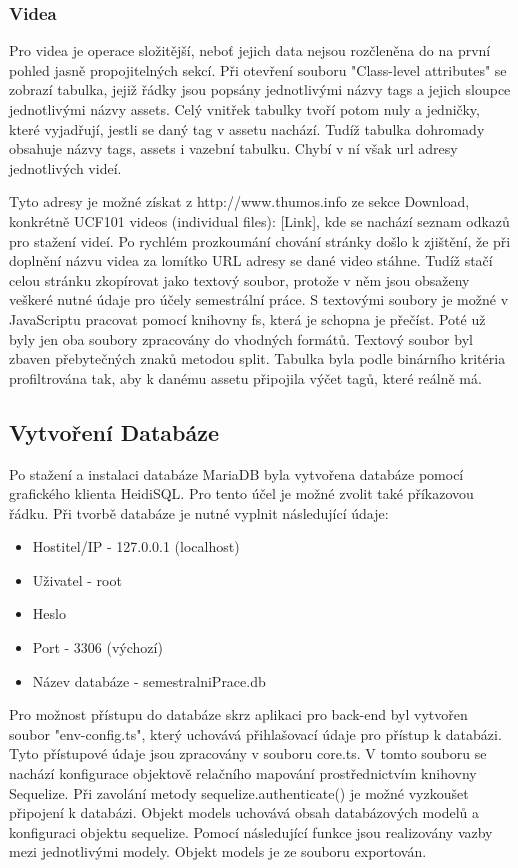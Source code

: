 \subsubsection{Videa}
Pro videa je operace složitější, neboť jejich data nejsou rozčleněna do na první pohled jasně propojitelných sekcí. Při otevření souboru "Class-level attributes" se zobrazí tabulka, jejiž řádky jsou popsány jednotlivými názvy tags a jejich sloupce jednotlivými názvy assets. Celý vnitřek tabulky tvoří potom nuly a jedničky, které vyjadřují, jestli se daný tag v assetu nachází. Tudíž tabulka dohromady obsahuje názvy tags, assets i vazební tabulku. Chybí v ní však url adresy jednotlivých videí. 

Tyto adresy je možné získat z http://www.thumos.info ze sekce Download, konkrétně UCF101 videos (individual files): [Link], kde se nachází seznam odkazů pro stažení videí. Po rychlém prozkoumání chování stránky došlo k zjištění, že při doplnění názvu videa za lomítko URL adresy se dané video stáhne. Tudíž stačí celou stránku zkopírovat jako textový soubor, protože v něm jsou obsaženy veškeré nutné údaje pro účely semestrální práce. S textovými soubory je možné v JavaScriptu pracovat pomocí knihovny fs, která je schopna je přečíst. Poté už byly jen oba soubory zpracovány do vhodných formátů. Textový soubor byl zbaven přebytečných znaků metodou split. Tabulka byla podle binárního kritéria profiltrována tak, aby k danému assetu připojila výčet tagů, které reálně má.

\subsection{Vytvoření Databáze}
Po stažení a instalaci databáze MariaDB byla vytvořena databáze pomocí grafického klienta HeidiSQL. Pro tento účel je možné zvolit také příkazovou řádku. Při tvorbě databáze je nutné vyplnit následující údaje:

\begin{itemize}
\item Hostitel/IP - 127.0.0.1 (localhost)
\item Uživatel - root
\item Heslo
\item Port - 3306 (výchozí)
\item Název databáze - semestralniPrace.db
\end{itemize}

Pro možnost přístupu do databáze skrz aplikaci pro back-end byl vytvořen soubor "env-config.ts", který uchovává přihlašovací údaje pro přístup k databázi. Tyto přístupové údaje jsou zpracovány v souboru core.ts. V tomto souboru se nachází konfigurace objektově relačního mapování prostřednictvím knihovny Sequelize. Při zavolání metody sequelize.authenticate() je možné vyzkoušet připojení k databázi. Objekt models uchovává obsah databázových modelů a konfiguraci objektu sequelize. Pomocí následující funkce jsou realizovány vazby mezi jednotlivými modely. Objekt models je ze souboru exportován.

